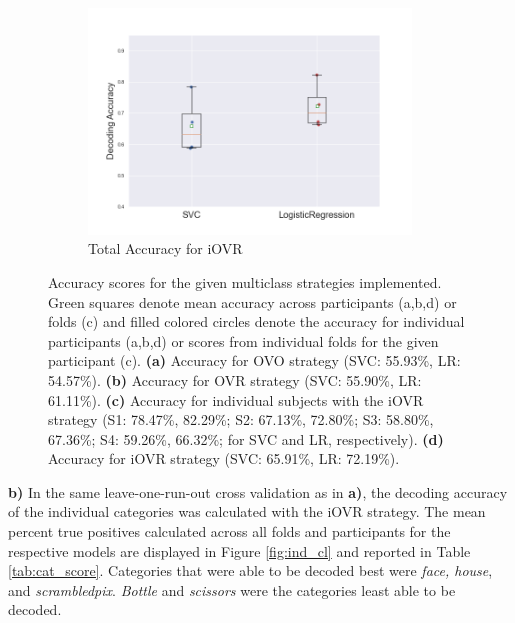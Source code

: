 \documentclass[11pt, a4paper]{article}
\begin{document}
\begin{figure}[hbt!]
\begin{subfigure}[b]{0.49\linewidth}
        \label{fig:ind_acc}
        \end{subfigure}
        \begin{subfigure}[b]{0.49\linewidth}
        \includegraphics[width=\linewidth, height=6cm]{acc_tot_new.png}
        \caption{Total Accuracy for iOVR}
        \label{fig:tot_acc}
        \end{subfigure}
    \caption{Accuracy scores for the given multiclass strategies implemented. Green squares denote mean accuracy across participants (a,b,d) or folds (c) and filled colored circles denote the accuracy for individual participants (a,b,d) or scores from individual folds for the given participant (c). \textbf{(a)} Accuracy for OVO strategy (SVC: 55.93\%, LR: 54.57\%). \textbf{(b)} Accuracy for OVR strategy (SVC: 55.90\%, LR: 61.11\%). \textbf{(c)} Accuracy for individual subjects with the iOVR strategy (S1: 78.47\%, 82.29\%; S2: 67.13\%, 72.80\%; S3: 58.80\%, 67.36\%; S4: 59.26\%, 66.32\%; for SVC and LR, respectively). \textbf{(d)} Accuracy for iOVR strategy (SVC: 65.91\%, LR: 72.19\%).}
    \label{fig:all_acc}
\end{figure}

%
\textbf{b)} In the same leave-one-run-out cross validation as in \textbf{a)}, the decoding accuracy of the individual categories was calculated with the iOVR strategy. The mean percent true positives calculated across all folds and participants for the respective models are displayed in Figure \ref{fig:ind_cl} and reported in Table \ref{tab:cat_score}. Categories that were able to be decoded best were \textit{face, house}, and \textit{scrambledpix}. \textit{Bottle} and \textit{scissors} were the categories least able to be decoded.  
\end{document}
